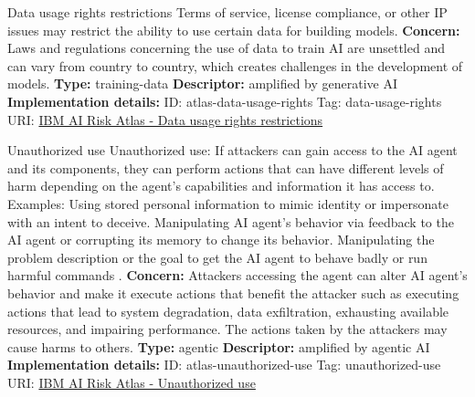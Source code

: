 \documentclass[a4paper,12pt]{article}
\begin{document}
\begin{definitionbox}{Data usage rights restrictions}
Terms of service, license compliance, or other IP issues may restrict the ability to use certain data for building models.\newline\newline
\textbf{Concern: }Laws and regulations concerning the use of data to train AI are unsettled and can vary from country to country, which creates challenges in the development of models.\newline\newline
\textbf{Type: }training-data\newline
\textbf{Descriptor: }amplified by generative AI \newline\newline
\textbf{Implementation details: } \newline
ID: atlas-data-usage-rights \newline
Tag: data-usage-rights \newline
URI:  \href{https://www.ibm.com/docs/en/watsonx/saas?topic=SSYOK8/wsj/ai-risk-atlas/data-usage-rights.html}{IBM AI Risk Atlas - Data usage rights restrictions}\newline
\end{definitionbox}
\begin{definitionbox}{Unauthorized use}
Unauthorized use: If attackers can gain access to the AI agent and its components, they can perform actions that can have different levels of harm depending on the agent's capabilities and information it has access to. Examples: Using stored personal information to mimic identity or impersonate with an intent to deceive. Manipulating AI agent's behavior via feedback to the AI agent or corrupting its memory to change its behavior. Manipulating the problem description or the goal to get the AI agent to behave badly or run harmful commands .\newline\newline
\textbf{Concern: }Attackers accessing the agent can alter AI agent's behavior and make it execute actions that benefit the attacker such as executing actions that lead to system degradation, data exfiltration, exhausting available resources, and impairing performance. The actions taken by the attackers may cause harms to others.\newline\newline
\textbf{Type: }agentic\newline
\textbf{Descriptor: }amplified by agentic AI \newline\newline
\textbf{Implementation details: } \newline
ID: atlas-unauthorized-use \newline
Tag: unauthorized-use \newline
URI:  \href{https://www.ibm.com/docs/en/watsonx/saas?topic=SSYOK8/wsj/ai-risk-atlas/unauthorized-use.html}{IBM AI Risk Atlas - Unauthorized use}\newline
\end{definitionbox}
\end{document}
